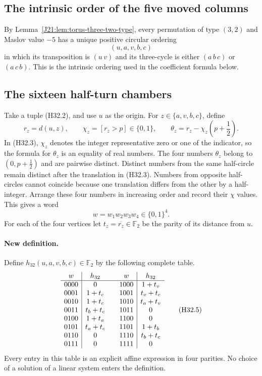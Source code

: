 \documentclass[11pt,oneside]{report}
\theoremstyle{definition}
\numberwithin{equation}{section}
\begin{document}
\subsection{The intrinsic order of the five moved columns}

By Lemma~\ref{J21:lem:torus-three-two-type}, every permutation of type
$(3,2)$ and Maslov value $-5$ has a unique positive circular ordering
\[
                         (u,a,v,b,c)
 \tag{H32.2}
\]
in which its transposition is $(u\,v)$ and its three-cycle is either
$(a\,b\,c)$ or $(a\,c\,b)$. This is the intrinsic ordering used in
the coefficient formula below.

\subsection{The sixteen half-turn chambers}

Take a tuple (H32.2), and use $u$ as the origin.
For $z\in\{a,v,b,c\}$, define
\[
 r_z=d(u,z),\qquad
 \chi_z=[r_z>p]\in\{0,1\},\qquad
 \theta_z=r_z-\chi_z\left(p+\frac12\right).
 \tag{H32.3}
\]
In (H32.3), $\chi_z$ denotes the integer representative zero or one
of the indicator, so the formula for $\theta_z$ is an equality of real
numbers. The four numbers $\theta_z$ belong to $(0,p+\tfrac12)$ and are
pairwise distinct. Distinct numbers from the same half-circle remain
distinct after the translation in (H32.3).
Numbers from opposite half-circles cannot coincide because one
translation differs from the other by a half-integer.
Arrange these four numbers in increasing order and record their
$\chi$ values. This gives a word
\[
                  w=w_1w_2w_3w_4\in\{0,1\}^4.
 \tag{H32.4}
\]
For each of the four vertices let
$t_z=\overline{r_z}\in\mathbb F _2$ be the parity of its distance
from $u$.

\paragraph{New definition.}
Define $h_{32}(u,a,v,b,c)\in\mathbb F _2$ by the following complete table.
\[
\begin{array}{c|c@{\qquad}c|c}
 w&h_{32}&w&h_{32}\\ \hline
 0000&0&1000&1+t_v\\
 0001&1+t_c&1001&t_v+t_c\\
 0010&1+t_c&1010&t_a+t_v\\
 0011&t_b+t_c&1011&0\\
 0100&1+t_a&1100&0\\
 0101&t_a+t_c&1101&1+t_b\\
 0110&0&1110&t_b+t_c\\
 0111&0&1111&0
\end{array}
 \tag{H32.5}
\]
Every entry in this table is an explicit affine expression in four
parities. No choice of a solution of a linear system enters the
definition.
\end{document}
